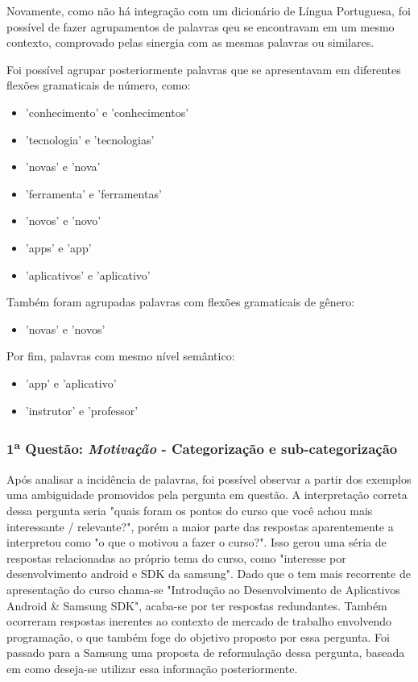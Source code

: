 Novamente, como não há integração com um dicionário de Língua Portuguesa, foi possível de fazer agrupamentos de palavras qeu se encontravam em um mesmo contexto, comprovado pelas sinergia com as mesmas palavras ou similares. 

Foi possível agrupar posteriormente palavras que se apresentavam em diferentes flexões gramaticais de número, como: 

\begin{itemize}
\item 'conhecimento' e 'conhecimentos'
\item 'tecnologia' e 'tecnologias' 
\item 'novas' e 'nova' 
\item 'ferramenta' e 'ferramentas' 
\item 'novos' e 'novo' 
\item 'apps' e 'app'
\item 'aplicativos' e 'aplicativo'
\end{itemize}

Também foram agrupadas palavras com flexões gramaticais de gênero:

\begin{itemize}
\item 'novas' e 'novos'
\end{itemize}

Por fim, palavras com mesmo nível semântico:

\begin{itemize}
\item 'app' e 'aplicativo'
\item 'instrutor' e 'professor'
\end{itemize}



\subsubsection*{1\textsuperscript{a} Questão: \textit{Motivação} - Categorização e sub-categorização }

Após analisar a incidência de palavras, foi possível observar a partir dos exemplos uma ambiguidade promovidos pela pergunta em questão. A interpretação correta dessa pergunta seria "quais foram os pontos do curso que você achou mais interessante / relevante?", porém a maior parte das respostas aparentemente a interpretou como "o que o motivou a fazer o curso?". Isso gerou uma séria de respostas relacionadas ao próprio tema do curso, como "interesse por desenvolvimento android e SDK da samsung". Dado que o tem mais recorrente de apresentação do curso chama-se "Introdução ao Desenvolvimento de Aplicativos Android \& Samsung SDK", acaba-se por ter respostas redundantes. Também ocorreram respostas inerentes ao contexto de mercado de trabalho envolvendo programação, o que também foge do objetivo proposto por essa pergunta. Foi passado para a Samsung uma proposta de reformulação dessa pergunta, baseada em como deseja-se utilizar essa informação posteriormente.

